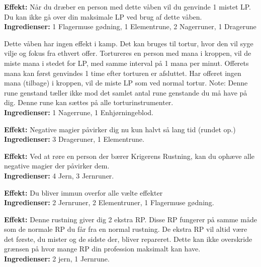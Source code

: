 \begin{runevåben*}[Livets Le]
\textbf{Effekt:} Når du dræber en person med dette våben vil du genvinde 1 mistet LP. Du kan ikke gå over din maksimale LP ved brug af dette våben.\\
\textbf{Ingredienser:} 1 Flagermuse gødning, 1 Elementrune, 2 Nagerruner, 1 Dragerune
\end{runevåben*}

\begin{runevåben*}
Dette våben har ingen effekt i kamp. Det kan bruges til tortur, hvor den vil syge vilje og fokus fra ethvert offer. Tortureres en person med mana i kroppen, vil de miste mana i stedet for LP, med samme interval på 1 mana per minut. Offerets mana kan først genvindes 1 time efter torturen er afsluttet. Har offeret ingen mana (tilbage) i kroppen, vil de miste LP som ved normal tortur.
Note: Denne rune genstand tæller ikke mod det samlet antal rune genstande du må have på dig. Denne rune kan sættes på alle torturinstrumenter.\\
\textbf{Ingredienser:} 1 Nagerrune, 1 Enhjørningeblod.
\end{runevåben*}

\begin{runerustning*}
\textbf{Effekt:} Negative magier påvirker dig nu kun halvt så lang tid (rundet op.)\\
\textbf{Ingredienser:} 3 Drageruner, 1 Elementrune.
\end{runerustning*}

\begin{runerustning*}
\textbf{Effekt:} Ved at røre en person der bærer Krigerens Rustning, kan du ophæve alle negative magier der påvirker dem.\\
\textbf{Ingredienser:} 4 Jern, 3 Jernruner.
\end{runerustning*}

\begin{runerustning*}
\textbf{Effekt:} Du bliver immun overfor alle vælte effekter\\
\textbf{Ingredienser:} 2 Jernruner, 2 Elementruner, 1 Flagermuse gødning.
\end{runerustning*}

\begin{runerustning*}
\textbf{Effekt:} Denne rustning giver dig 2 ekstra RP. Disse RP fungerer på samme måde som de normale RP du får fra en normal rustning. De ekstra RP vil altid være det første, du mister og de sidste der, bliver repareret. Dette kan ikke overskride grænsen på hvor mange RP din profession maksimalt kan have.\\
\textbf{Ingredienser:} 2 jern, 1 Jernrune.
\end{runerustning*}

